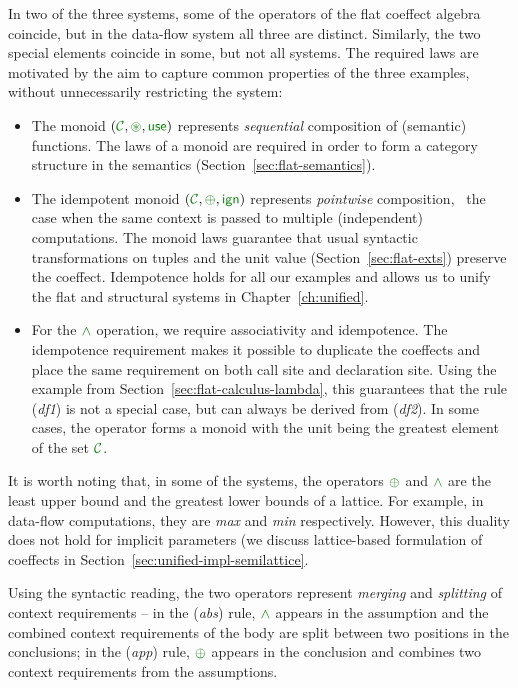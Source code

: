 \noindent
In two of the three systems, some of the operators of the flat coeffect algebra coincide, but
in the data-flow system all three are distinct. Similarly, the two special elements  
coincide in some, but not all systems. The required laws are motivated by the aim to capture
common properties of the three examples, without unnecessarily restricting the system:

\begin{itemize}
\item The monoid $(\C, \cseq, \cunit)$ represents \emph{sequential} composition of (semantic)
functions. The laws of a monoid are required in order to form a category structure in the 
semantics (Section~\ref{sec:flat-semantics}).

\item The idempotent monoid $(\C, \cpar, \czero)$ represents \emph{pointwise} composition, 
\ie~the case when the same context is passed to multiple (independent) computations. The monoid 
laws guarantee that usual syntactic transformations on tuples and the unit value 
(Section~\ref{sec:flat-exts}) preserve the coeffect. Idempotence holds for all our examples
and allows us to unify the flat and structural systems in Chapter~\ref{ch:unified}.

\item For the $\czip$ operation, we require associativity and idempotence. The idempotence
requirement makes it possible to duplicate the coeffects and place the same requirement on both
call site and declaration site. Using the example from Section~\ref{sec:flat-calculus-lambda},
this guarantees that the rule (\emph{df1}) is not a special case, but can always be derived 
from (\emph{df2}). In some cases, the operator forms a monoid with the unit being the greatest 
element of the set $\C$. 
\end{itemize}

\noindent
It is worth noting that, in some of the systems, the operators $\cpar$ and $\czip$ are the least 
upper bound and the greatest lower bounds of a lattice. For example, in data-flow computations, they 
are \emph{max} and \emph{min} respectively. However, this duality does not hold for implicit parameters
(we discuss lattice-based formulation of coeffects in Section~\ref{sec:unified-impl-semilattice}. 

Using the syntactic reading, the two operators represent \emph{merging} and \emph{splitting} of context 
requirements -- in the (\emph{abs}) rule, $\czip$ appears in the assumption and the combined context 
requirements of the body are split between two positions in the conclusions; in the (\emph{app}) rule, 
$\cpar$ appears in the conclusion and combines two context requirements from the assumptions.

